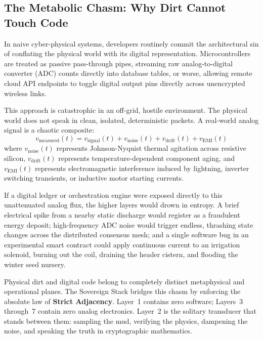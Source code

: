 \subsection{The Metabolic Chasm: Why Dirt Cannot Touch Code}

In naive cyber-physical systems, developers routinely commit the architectural sin of conflating the physical world with its digital representation. Microcontrollers are treated as passive pass-through pipes, streaming raw analog-to-digital converter (ADC) counts directly into database tables, or worse, allowing remote cloud API endpoints to toggle digital output pins directly across unencrypted wireless links.

This approach is catastrophic in an off-grid, hostile environment. The physical world does not speak in clean, isolated, deterministic packets. A real-world analog signal is a chaotic composite:
\begin{equation}
v_{\mathrm{measured}}(t) = v_{\mathrm{signal}}(t) + v_{\mathrm{noise}}(t) + v_{\mathrm{drift}}(t) + v_{\mathrm{EMI}}(t)
\label{eq:l2_analog_reality}
\end{equation}
where $v_{\mathrm{noise}}(t)$ represents Johnson-Nyquist thermal agitation across resistive silicon, $v_{\mathrm{drift}}(t)$ represents temperature-dependent component aging, and $v_{\mathrm{EMI}}(t)$ represents electromagnetic interference induced by lightning, inverter switching transients, or inductive motor starting currents.

If a digital ledger or orchestration engine were exposed directly to this unattenuated analog flux, the higher layers would drown in entropy. A brief electrical spike from a nearby static discharge would register as a fraudulent energy deposit; high-frequency ADC noise would trigger endless, thrashing state changes across the distributed consensus mesh; and a single software bug in an experimental smart contract could apply continuous current to an irrigation solenoid, burning out the coil, draining the header cistern, and flooding the winter seed nursery.

Physical dirt and digital code belong to completely distinct metaphysical and operational planes. The Sovereign Stack bridges this chasm by enforcing the absolute law of \textbf{Strict Adjacency}. Layer~1 contains zero software; Layers~3 through~7 contain zero analog electronics. Layer~2 is the solitary transducer that stands between them: sampling the mud, verifying the physics, dampening the noise, and speaking the truth in cryptographic mathematics.

